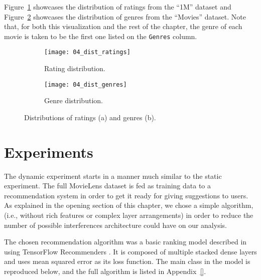 Figure~\ref{fig:fig04_dist_ratings} showcases the distribution of ratings from
the ``1M'' dataset and Figure~\ref{fig:fig04_dist_genres} showcases the
distribution of genres from the ``Movies'' dataset. Note that, for both this
visualization and the rest of the chapter, the genre of each movie is taken to
be the first one listed on the \verb|Genres| column.

\begin{figure}
  \centering
  \begin{subfigure}{0.45\textwidth}
    \centering
    \texttt{[image: 04\_dist\_ratings]}
    \caption{Rating distribution.\label{fig:fig04_dist_ratings}}
  \end{subfigure}
  \begin{subfigure}{0.45\textwidth}
    \centering
    \texttt{[image: 04\_dist\_genres]}
    \caption{Genre distribution.\label{fig:fig04_dist_genres}}
  \end{subfigure}
  \caption{Distributions of ratings (a) and genres
  (b).\label{fig:fig04_dist_both}}
\end{figure}

\section{Experiments}
\label{sec:experiments04}

The dynamic experiment starts in a manner much similar to the static experiment.
The full MovieLens dataset is fed as training data to a recommendation system in
order to get it ready for giving suggestions to users. As explained in the
opening section of this chapter, we chose a simple algorithm, (i.e., without
rich features or complex layer arrangements) in order to reduce the number of
possible interferences architecture could have on our analysis.

The chosen recommendation algorithm was a basic ranking model described in
\citet{} using TensorFlow Recommenders \citep{}. It is composed of multiple
stacked dense layers and uses mean squared error as its loss function. The main
class in the model is reproduced below, and the full algorithm is listed in
Appendix~\ref{}.



